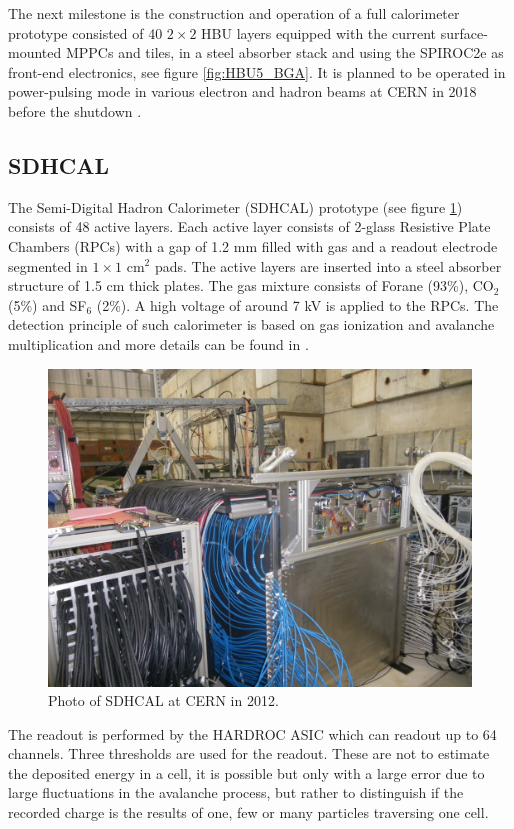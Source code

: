 The next milestone is the construction and operation of a full calorimeter prototype consisted of 40 $2\times2$ HBU layers equipped with the current surface-mounted MPPCs and tiles, in a steel absorber stack and using the SPIROC2e as front-end electronics, see figure \ref{fig:HBU5_BGA}. It is planned to be operated in power-pulsing mode in various electron and hadron beams at CERN in 2018 before the shutdown \cite{Felix:AHCALMain2017}.

\subsection{SDHCAL}

The Semi-Digital Hadron Calorimeter (SDHCAL) prototype (see figure \ref{fig:SDHCAL}) consists of 48 active layers. Each active layer consists of 2-glass Resistive Plate Chambers (RPCs) \cite{BEDJIDIAN2010120} with a gap of 1.2 mm filled with gas and a readout electrode segmented in $1\times1$ cm$^2$ pads. The active layers are inserted into a steel absorber structure of 1.5 cm thick plates. The gas mixture consists of Forane (93\%), CO$_2$ (5\%) and SF$_6$ (2\%). A high voltage of around 7 kV is applied to the RPCs. The detection principle of such calorimeter is based on gas ionization and avalanche multiplication and more details can be found in \cite{1748-0221-10-10-P10039}.

\begin{figure}[htbp!]
  \centering
  \includegraphics[width=0.7\linewidth]{chap3/fig/SDHCAL.jpg}
  \caption{Photo of SDHCAL at CERN in 2012.} \label{fig:SDHCAL}
\end{figure}

The readout is performed by the HARDROC ASIC \cite{HARDROC:IEEE} which can readout up to 64 channels. Three thresholds are used for the readout. These are not to estimate the deposited energy in a cell, it is possible but only with a large error due to large fluctuations in the avalanche process, but rather to distinguish if the recorded charge is the results of one, few or many particles traversing one cell.

